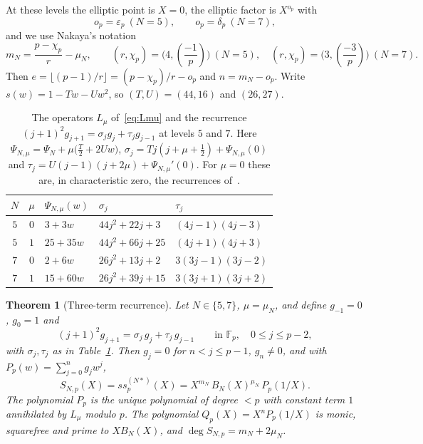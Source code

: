 \documentclass[11pt,a4paper]{article}
\newtheorem{theorem}{Theorem}[section]
\theoremstyle{definition}
\theoremstyle{remark}
\newcommand{\F}{\mathbb{F}}
\newcommand{\leg}[2]{\left(\frac{#1}{#2}\right)}
\newcommand{\ssp}{\mathit{ss}_p}
\numberwithin{equation}{section}
\begin{document}
At these levels the elliptic point is $X=0$, the elliptic factor is $X^{o_p}$
with
\[
o_p=\varepsilon_p\ (N=5),\qquad o_p=\delta_p\ (N=7),
\]
and we use Nakaya's notation
\begin{equation}\label{eq:mN}
m_N=\frac{p-\chi_p}{r}-\mu_N,\qquad
(r,\chi_p)=\bigl(4,\leg{-1}{p}\bigr)\ (N=5),\quad
(r,\chi_p)=\bigl(3,\leg{-3}{p}\bigr)\ (N=7).
\end{equation}
Then $e=\lfloor(p-1)/r\rfloor=(p-\chi_p)/r-o_p$ and $n=m_N-o_p$. Write
$s(w)=1-Tw-Uw^2$, so $(T,U)=(44,16)$ and $(26,27)$.

\begin{table}[htbp]
\centering\small
\renewcommand{\arraystretch}{1.3}\setlength{\tabcolsep}{7pt}
\begin{tabular}{@{}cclll@{}}
\toprule
$N$ & $\mu$ & $\Psi_{N,\mu}(w)$ & $\sigma_j$ & $\tau_j$\\
\midrule
$5$ & $0$ & $3+3w$ & $44j^2+22j+3$ & $(4j-1)(4j-3)$\\
$5$ & $1$ & $25+35w$ & $44j^2+66j+25$ & $(4j+1)(4j+3)$\\
$7$ & $0$ & $2+6w$ & $26j^2+13j+2$ & $3(3j-1)(3j-2)$\\
$7$ & $1$ & $15+60w$ & $26j^2+39j+15$ & $3(3j+1)(3j+2)$\\
\bottomrule
\end{tabular}
\caption{The operators $L_\mu$ of~\eqref{eq:Lmu} and the recurrence
$(j+1)^2g_{j+1}=\sigma_jg_j+\tau_jg_{j-1}$ at levels $5$ and $7$. Here
$\Psi_{N,\mu}=\Psi_N+\mu\bigl(\tfrac T2+2Uw\bigr)$,
$\sigma_j=Tj(j+\mu+\tfrac12)+\Psi_{N,\mu}(0)$ and
$\tau_j=U(j-1)(j+2\mu)+\Psi_{N,\mu}'(0)$. For $\mu=0$ these are, in
characteristic zero, the recurrences of~\cite[Lemma~3.3]{Sakai14}.}
\label{tab:rec}
\end{table}

\begin{theorem}[Three-term recurrence]\label{thm:rat}
Let $N\in\{5,7\}$, $\mu=\mu_N$, and define $g_{-1}=0$, $g_0=1$ and
\begin{equation}\label{eq:ratrec}
(j+1)^2g_{j+1}=\sigma_j\,g_j+\tau_j\,g_{j-1}\qquad\text{in }\F_p,\quad 0\le j\le p-2,
\end{equation}
with $\sigma_j,\tau_j$ as in Table~\ref{tab:rec}. Then $g_j=0$ for
$n<j\le p-1$, $g_n\ne0$, and with $P_p(w)=\sum_{j=0}^{n}g_jw^j$,
\begin{equation}\label{eq:ratformula}
 S_{N,p}(X)=\ssp^{(N*)}(X)=X^{m_N}\,B_N(X)^{\mu_N}\,P_p(1/X).
\end{equation}
The polynomial $P_p$ is the unique polynomial of degree $<p$ with constant
term $1$ annihilated by $L_\mu$ modulo $p$. The polynomial
$Q_p(X)=X^{n}P_p(1/X)$ is monic, squarefree and prime to $XB_N(X)$, and
$\deg S_{N,p}=m_N+2\mu_N$.
\end{theorem}
\end{document}
